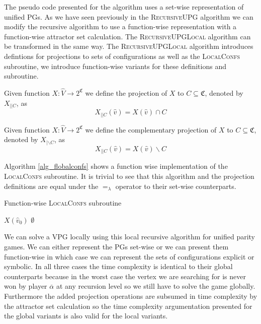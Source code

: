 The pseudo code presented for the algorithm uses a set-wise representation of unified PGs. As we have seen previously in the \textsc{RecursiveUPG} algorithm we can modify the recursive algorithm to use a function-wise representation with a function-wise attractor set calculation. The \textsc{RecursiveUPGLocal} algorithm can be transformed in the same way. The \textsc{RecursiveUPGLocal} algorithm introduces defintions for projections to sets of configurations as well as the \textsc{LocalConfs} subroutine, we introduce function-wise variants for these definitions and subroutine.
\begin{definition}
	Given function $X : \hat{V} \rightarrow 2^\mathfrak{C}$ we define the projection of $X$ to $C \subseteq \mathfrak{C}$, denoted by $X_{||C}$, as
	\[ X_{||C}(\hat{v}) = X(\hat{v}) \cap C \]
\end{definition}
\begin{definition}
	Given function $X : \hat{V} \rightarrow 2^\mathfrak{C}$ we define the complementary projection of $X$ to $C \subseteq \mathfrak{C}$, denoted by $X_{|\backslash C}$, as
	\[ X_{||C}(\hat{v}) = X(\hat{v}) \backslash C \]
\end{definition}
Algorithm \ref{alg_flobalconfs} shows a function wise implementation of the \textsc{LocalConfs} subroutine. It is trivial to see that this algorithm and the projection definitions are equal under the $=_\lambda$ operator to their set-wise counterparts.
\begin{algorithm}
	\caption{Function-wise \textsc{LocalConfs} subroutine}
	\label{alg_flobalconfs}
	\begin{algorithmic}[1]
		\If{$\overline{\alpha} \in \Delta$}
		\State \Return $X(\hat{v}_0)$
		\Else
		\State \Return $\emptyset$
		\EndIf
		\EndFunction
	\end{algorithmic}
\end{algorithm}

We can solve a VPG locally using this local recursive algorithm for unified parity games. We can either represent the PGs set-wise or we can present them function-wise in which case we can represent the sets of configurations explicit or symbolic. In all three cases the time complexity is identical to their global counterparts because in the worst case the vertex we are searching for is never won by player $\overline{\alpha}$ at any recursion level so we still have to solve the game globally. Furthermore the added projection operations are subsumed in time complexity by the attractor set calculation so the time complexity argumentation presented for the global variants is also valid for the local variants. 